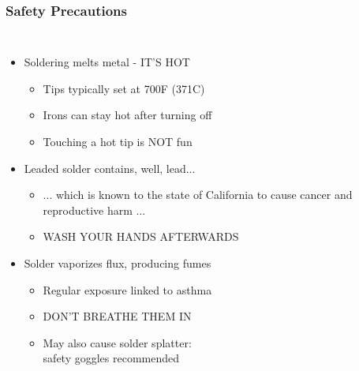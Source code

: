 \documentclass{beamer}
\begin{document}
\begin{frame}
\frametitle{Safety Precautions}
\begin{columns}[t]
\begin{itemize}
  \item Soldering melts metal - IT'S HOT
  \begin{itemize}
    \item Tips typically set at 700\textdegree F (371\textdegree C)
    \item Irons can stay hot after turning off
    \item Touching a hot tip is NOT fun
  \end{itemize}
  \item Leaded solder contains, well, lead...
  \begin{itemize}
    \item ... which is known to the state of California to cause cancer and reproductive harm ...
    \item WASH YOUR HANDS AFTERWARDS
  \end{itemize}
  \item Solder vaporizes flux, producing fumes
  \begin{itemize}
    \item Regular exposure linked to asthma
    \item DON'T BREATHE THEM IN
    \item May also cause solder splatter: \\
    safety goggles recommended
  \end{itemize}
\end{itemize}


\end{columns}
\end{frame}
\end{document}
